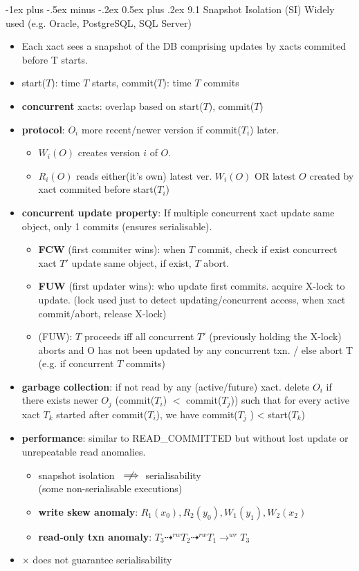 \documentclass[10pt, landscape]{article}
\makeatletter
\renewcommand{\section}{\@startsection{section}{1}{0mm}%
                                {-1ex plus -.5ex minus -.2ex}%
                                {0.5ex plus .2ex}%
                                {\normalfont\large\bfseries}}
\makeatother
\begin{document}
\begin{multicols*}{3}
\section{9.1 Snapshot Isolation (SI)}
Widely used (e.g. Oracle, PostgreSQL, SQL Server)
\begin{itemize}
\item Each xact sees a snapshot of the DB comprising updates by xacts commited before T starts.
\item start($T$): time $T$ starts, commit($T$): time $T$ commits
\item \textbf{concurrent} xacts: overlap based on start($T$), commit($T$)
\item \textbf{protocol}: $O_i$ more recent/newer version if commit($T_i$) later.
	\begin{itemize}
	\item $W_i(O)$ creates version $i$ of $O$.
	\item $R_i(O)$ reads either(it's own) latest ver. $W_i(O)$ OR latest $O$ created by xact commited before start($T_i$)
	\end{itemize}
\item \textbf{concurrent update property}: If multiple concurrent xact update same object, only 1 commits (ensures serialisable).
	\begin{itemize}
	\item \textbf{FCW} (first commiter wins): when $T$ commit, check if exist concurrect xact $T'$ update same object, if exist, $T$ abort.
	\item \textbf{FUW} (first updater wins): who update first commits. acquire X-lock to update. (lock used just to detect updating/concurrent access, when xact commit/abort, release X-lock)
	\item (FUW): $T$ proceeds iff all concurrent $T'$ (previously holding the X-lock) aborts and O has not been updated by any concurrent txn. / else abort T (e.g. if concurrent $T$ commits)
	\end{itemize}
\item \textbf{garbage collection}: if not read by any (active/future) xact. delete $O_i$ if there exists newer $O_j$ (commit($T_i$) $<$ commit($T_j$)) such that for every active xact $T_k$ started after commit($T_i$), we have commit($T_j$ ) < start($T_k$)
\item \textbf{performance}: similar to READ\_COMMITTED but without lost update or unrepeatable read anomalies.
	\begin{itemize}
	\item snapshot isolation $\rlap{\(\quad\not\)}\implies$ serialisability \\
 (some non-serialisable executions)
	\item \textbf{write skew anomaly}: $R_1(x_0), R_2(y_0), W_1(y_1), W_2(x_2)$
	\item \textbf{read-only txn anomaly}: $T_3 \dashrightarrow^{rw} T_2 \dashrightarrow^{rw} T_1 \rightarrow^{wr} T_3$ 
	\end{itemize}
\item $\times$ does not guarantee serialisability
\end{itemize}


\end{multicols*}
\end{document}

